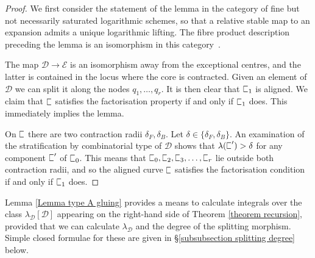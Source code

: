\documentclass[11pt]{amsart}
\newcommand{\sqC}{\scalebox{0.8}[1.3]{$\sqsubset$}}
\newcommand{\PP}{\mathbb P}
\renewcommand{\to}{\rightarrow}
\newcommand{\Dcal}{\mathcal{D}}
\newcommand{\Ecal}{\mathcal{E}}
\theoremstyle{definition}
\newtheorem{lemma}[thm]{Lemma}
\theoremstyle{definition}
\begin{document}
\begin{proof}
We first consider the statement of the lemma in the category of fine but not necessarily saturated logarithmic schemes, so that a relative stable map to an expansion admits a unique logarithmic lifting. The fibre product description preceding the lemma is an isomorphism in this category~\cite[Lemma~4.2.2]{AbramovichMarcusWiseComparison}.

The map $\Dcal\to\Ecal$ is an isomorphism away from the exceptional centres, and the latter is contained in the locus where the core is contracted. Given an element of $\Dcal$ we can split it along the nodes $q_1,\ldots,q_r$. It is then clear that $\sqC_1$ is aligned. We claim that $\sqC$ satisfies the factorisation property if and only if $\sqC_1$ does. This immediately implies the lemma.

On $\sqC$ there are two contraction radii $\delta_F,\delta_B$. Let $\delta \in \{\delta_F,\delta_B\}$. An examination of the stratification by combinatorial type of $\Dcal$ shows that $\lambda(\sqC^\prime) > \delta$ for any component $\sqC^\prime$ of $\sqC_0$. This means that $\sqC_0,\sqC_2,\sqC_3,\ldots,\sqC_r$ lie outside both contraction radii, and so the aligned curve $\sqC$ satisfies the factorisation condition if and only if $\sqC_1$ does. \end{proof}

%
\noindent Lemma \ref{Lemma type A gluing} provides a means to calculate integrals over the class $\lambda_\Dcal[\Dcal]$ appearing on the right-hand side of Theorem \ref{theorem recursion}, provided that we can calculate $\lambda_\Dcal$ and the degree of the splitting morphism. Simple closed formulae for these are given in \S \ref{subsubsection splitting degree} below.
\end{document}
